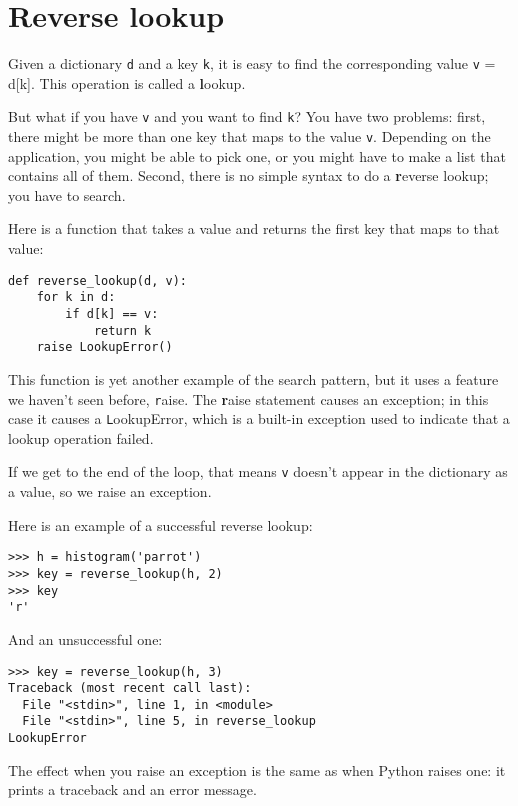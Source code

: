 \documentclass[
DIV=11,
fontsize=13,
twoside,
headinclude=false,
titlepage=firstiscover,
abstract=true,
headsepline=true,
footsepline=true,
chapterprefix=true, %
headings=big,
bibliography=totoc,%
captions=tableheading
]{scrbook}
\theoremstyle{definition}
\begin{document}
\section{Reverse lookup}
\label{raise}

Given a dictionary {\texttt d} and a key {\texttt k}, it is easy to
find the corresponding value {\texttt v = d[k]}.  This operation
is called a {\textbf lookup}.

But what if you have {\texttt v} and you want to find {\texttt k}?
You have two problems: first, there might be more than one
key that maps to the value {\texttt v}.  Depending on the application,
you might be able to pick one, or you might have to make
a list that contains all of them.  Second, there is no
simple syntax to do a {\textbf reverse lookup}; you have to search.

Here is a function that takes a value and returns the first
key that maps to that value:

\begin{lstlisting}
def reverse_lookup(d, v):
    for k in d:
        if d[k] == v:
            return k
    raise LookupError()
\end{lstlisting}
%
This function is yet another example of the search pattern, but it
uses a feature we haven't seen before, {\texttt raise}.  The 
{\textbf raise statement} causes an exception; in this case it causes a
{\texttt LookupError}, which is a built-in exception used to indicate
that a lookup operation failed.
  
 

If we get to the end of the loop, that means {\texttt v}
doesn't appear in the dictionary as a value, so we raise an
exception.

Here is an example of a successful reverse lookup:

\begin{lstlisting}
>>> h = histogram('parrot')
>>> key = reverse_lookup(h, 2)
>>> key
'r'
\end{lstlisting}
%
And an unsuccessful one:

\begin{lstlisting}
>>> key = reverse_lookup(h, 3)
Traceback (most recent call last):
  File "<stdin>", line 1, in <module>
  File "<stdin>", line 5, in reverse_lookup
LookupError
\end{lstlisting}
%
The effect when you raise an exception is the same as when
Python raises one: it prints a traceback and an error message.
\end{document}
